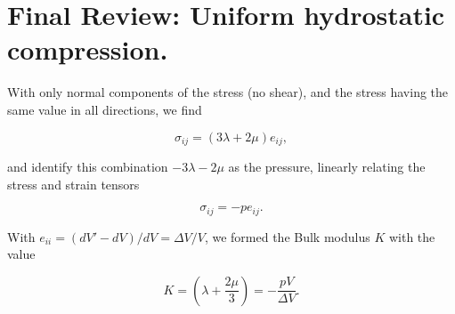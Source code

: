 \section{Final Review: Uniform hydrostatic compression.}

With only normal components of the stress (no shear), and the stress having the same value in all directions, we find

\begin{equation}\label{eqn:continuumElasticityReview:350}
\sigma_{ij} = ( 3 \lambda + 2 \mu ) e_{ij},
\end{equation}

and identify this combination $-3 \lambda - 2 \mu$ as the pressure, linearly relating the stress and strain tensors

\begin{equation}\label{eqn:continuumElasticityReview:370}
\sigma_{ij} = -p e_{ij}.
\end{equation}

With $e_{ii} = (dV' - dV)/dV = \Delta V/V$, we formed the Bulk modulus $K$ with the value

\begin{equation}\label{eqn:continuumElasticityReview:390}
K = \left( \lambda + \frac{2 \mu}{3} \right) = -\frac{p V}{\Delta V}.
\end{equation}


